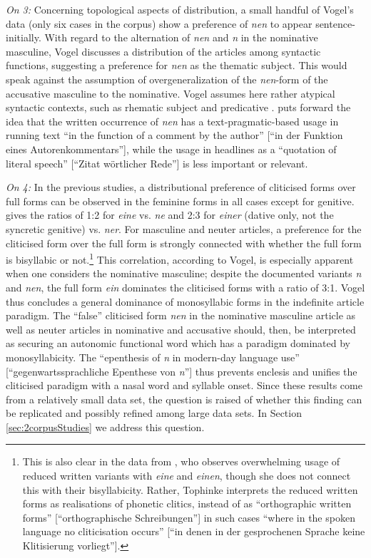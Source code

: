 \textit{On 3:}
Concerning topological aspects of distribution, a small handful of Vogel's data (only six cases in the corpus) show a preference of \textit{nen} to appear sentence-initially.
With regard to the alternation of \textit{nen} and \textit{n} in the nominative masculine, Vogel discusses a distribution of the articles among syntactic functions, suggesting a preference for \textit{nen} as the thematic subject.
This would speak against the assumption of overgeneralization of the \textit{nen}-form of the accusative masculine to the nominative.
Vogel assumes here rather atypical syntactic contexts, such as rhematic subject and predicative \citep[184]{Vogel2006}.
\citet[301]{Ziegler2012} puts forward the idea that the written occurrence of \textit{nen} has a text-pragmatic-based usage in running text ``in the function of a comment by the author'' [``in der Funktion eines Autorenkommentars''], while the usage in headlines as a ``quotation of literal speech'' [``Zitat wörtlicher Rede''] \citep[301]{Ziegler2012} is less important or relevant.

\textit{On 4:}
In the previous studies, a distributional preference of cliticised forms over full forms can be observed in the feminine forms in all cases except for genitive.
\citet[185]{Vogel2006} gives the ratios of 1:2 for \textit{eine} vs. \textit{ne} and 2:3 for \textit{einer} (dative only, not the syncretic genitive) vs. \textit{ner}.
For masculine and neuter articles, a preference for the cliticised form over the full form is strongly connected with whether the full form is bisyllabic or not.\footnote{
	This is also clear in the data from \citet[173]{Tophinke2002}, who observes overwhelming usage of reduced written variants with \textit{eine} and \textit{einen}, though she does not connect this with their bisyllabicity.
	Rather, Tophinke interprets the reduced written forms as realisations of phonetic clitics, instead of as ``orthographic written forms'' [``orthographische Schreibungen''] in such cases ``where in the spoken language no cliticisation occurs'' [``in denen in der gesprochenen Sprache keine Klitisierung vorliegt''].}
This correlation, according to Vogel, is especially apparent when one considers the nominative masculine; despite the documented variants \textit{n} and \textit{nen}, the full form \textit{ein} dominates the cliticised forms with a ratio of 3:1.
Vogel thus concludes a general dominance of monosyllabic forms in the indefinite article paradigm.
The ``false'' cliticised form \textit{nen} in the nominative masculine article as well as neuter articles in nominative and accusative should, then, be interpreted as securing an autonomic functional word which has a paradigm dominated by monosyllabicity.
The ``epenthesis of \textit{n} in modern-day language use'' [``gegenwartssprachliche Epenthese von \textit{n}''] \citep[198]{Vogel2006} thus prevents enclesis and unifies the cliticised paradigm with a nasal word and syllable onset.
Since these results come from a relatively small data set, the question is raised of whether this finding can be replicated and possibly refined among large data sets.
In Section \ref{sec:2corpusStudies} we address this question.

